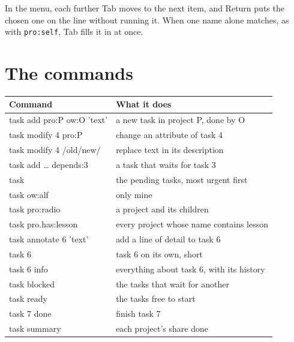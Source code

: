 \documentclass[11pt,a4paper]{article}
\begin{document}
In the  menu, each further Tab moves to the next item, and Return puts the chosen one on the line without running it. When one name alone matches, as with \texttt{pro:self}, Tab fills it in at once.

\section*{The commands}

\begin{center}
\small
\begin{tabular}{@{}>{\ttfamily}l l@{}}
\toprule
\normalfont\textbf{Command} & \textbf{What it does} \\
\midrule
\textcolor{cmd}{task} \textcolor{sub}{add} \textcolor{attr}{pro:P} \textcolor{attr}{ow:O} \textcolor{desc}{'text'} & a new task in project P, done by O \\
\textcolor{cmd}{task} \textcolor{sub}{modify} 4 \textcolor{attr}{pro:P} & change an attribute of task 4 \\
\textcolor{cmd}{task} \textcolor{sub}{modify} 4 /old/new/ & replace text in its description \\
\textcolor{cmd}{task} \textcolor{sub}{add} … \textcolor{attr}{depends:3} & a task that waits for task 3 \\
\textcolor{cmd}{task} & the pending tasks, most urgent first \\
\textcolor{cmd}{task} \textcolor{attr}{ow:alf} & only mine \\
\textcolor{cmd}{task} \textcolor{attr}{pro:radio} & a project and its children \\
\textcolor{cmd}{task} \textcolor{attr}{pro.has:lesson} & every project whose name contains lesson \\
\textcolor{cmd}{task} \textcolor{sub}{annotate} 6 \textcolor{desc}{'text'} & add a line of detail to task 6 \\
\textcolor{cmd}{task} 6 & task 6 on its own, short \\
\textcolor{cmd}{task} 6 \textcolor{sub}{info} & everything about task 6, with its history \\
\textcolor{cmd}{task} \textcolor{sub}{blocked} & the tasks that wait for another \\
\textcolor{cmd}{task} \textcolor{sub}{ready} & the tasks free to start \\
\textcolor{cmd}{task} 7 \textcolor{sub}{done} & finish task 7 \\
\textcolor{cmd}{task} \textcolor{sub}{summary} & each project's share done \\
\bottomrule
\end{tabular}
\end{center}

\revisiontable
\end{document}
